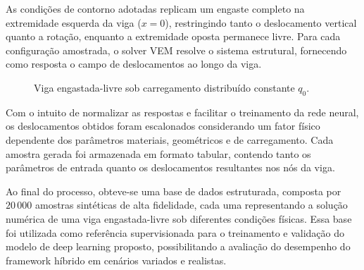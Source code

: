 \documentclass[12pt,openright,oneside,a4paper,english,brazil]{abntex2}
\begin{document}
As condições de contorno adotadas replicam um engaste completo na extremidade esquerda da viga ($x = 0$), restringindo tanto o deslocamento vertical quanto a rotação, enquanto a extremidade oposta permanece livre. Para cada configuração amostrada, o solver VEM resolve o sistema estrutural, fornecendo como resposta o campo de deslocamentos ao longo da viga.

\begin{figure}[H]
    \centering
    \caption{Viga engastada-livre sob carregamento distribuído constante $q_0$.}
    \label{fig:viga_engastada_livre}
\end{figure}

Com o intuito de normalizar as respostas e facilitar o treinamento da rede neural, os deslocamentos obtidos foram escalonados considerando um fator físico dependente dos parâmetros materiais, geométricos e de carregamento. Cada amostra gerada foi armazenada em formato tabular, contendo tanto os parâmetros de entrada quanto os deslocamentos resultantes nos nós da viga.

Ao final do processo, obteve-se uma base de dados estruturada, composta por $20\,000$ amostras sintéticas de alta fidelidade, cada uma representando a solução numérica de uma viga engastada-livre sob diferentes condições físicas. Essa base foi utilizada como referência supervisionada para o treinamento e validação do modelo de deep learning proposto, possibilitando a avaliação do 
desempenho do framework híbrido em cenários variados e realistas.
\end{document}
